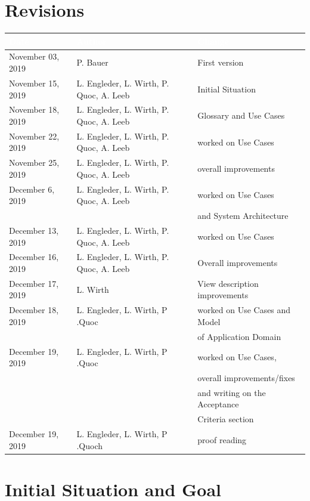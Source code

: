 \documentclass[12pt]{article}
\theoremstyle{definition}
\begin{document}
\section*{Revisions}
\begin{tabular}{|l|l|l|}
\hline
\cellcolor[gray]{0.5}\textcolor{white}{Date} & \cellcolor[gray]{0.5}\textcolor{white}{Author} & \cellcolor[gray]{0.5}\textcolor{white}{Change} \\ \hline
November 03, 2019&P. Bauer&First version \\ \hline
November 15, 2019&L. Engleder, L. Wirth, P. Quoc, A. Leeb & Initial Situation \\ \hline
November 18, 2019&L. Engleder, L. Wirth, P. Quoc, A. Leeb & Glossary and Use Cases \\ \hline
November 22, 2019&L. Engleder, L. Wirth, P. Quoc, A. Leeb & worked on Use Cases \\ \hline
November 25, 2019&L. Engleder, L. Wirth, P. Quoc, A. Leeb & overall improvements \\ \hline
December 6, 2019&L. Engleder, L. Wirth, P. Quoc, A. Leeb & worked on Use Cases \\ 
&& and System Architecture \\ \hline
December 13, 2019&L. Engleder, L. Wirth, P. Quoc, A. Leeb & worked on Use Cases \\ \hline
December 16, 2019&L. Engleder, L. Wirth, P. Quoc, A. Leeb & Overall improvements \\ \hline
December 17, 2019&L. Wirth & View description improvements \\ \hline
December 18, 2019&L. Engleder, L. Wirth, P .Quoc & worked on Use Cases and Model \\
&& of Application Domain \\ \hline
December 19, 2019&L. Engleder, L. Wirth, P .Quoc & worked on Use Cases, \\
&& overall improvements/fixes \\
&& and writing on the Acceptance \\
&& Criteria section \\ \hline
December 19, 2019&L. Engleder, L. Wirth, P .Quoch & proof reading \\ \hline

\end{tabular}
\pagebreak

\listoffigures
\pagebreak

\tableofcontents
\pagebreak

\section{Initial Situation and Goal}
\end{document}
